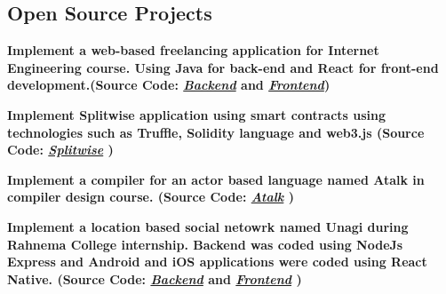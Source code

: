 \documentclass[line, mm]{sampleCV}
\begin{document}
\begin{resume}
\section{\mysidestyle Open Source Projects}
\begin{list2}

\item \textbf {Implement a web-based freelancing application for Internet Engineering course. Using Java for back-end and React for front-end development.(Source Code: \href{https://github.com/sh-soltanpour/neyanboon}{\textit{Backend}} and 
	\href{https://github.com/sh-soltanpour/daf}{\textit{Frontend}})
} 


 
\item \textbf {Implement Splitwise application using smart contracts using technologies such as Truffle, Solidity language and web3.js (Source Code: \href{https://github.com/sh-soltanpour/splitwise}{\textit{Splitwise}}
		)
}
\item \textbf {Implement a compiler for an actor based language named Atalk in compiler design course. (Source Code: \href{https://github.com/sh-soltanpour/Atalk-Compiler}{\textit{Atalk}}
	)
}

\item \textbf {Implement a location based social netowrk named Unagi during Rahnema College internship. Backend was coded using NodeJs Express and Android and iOS applications were coded using React Native. (Source Code: \href{https://github.com/sh-soltanpour/UnagiServer}{\textit{Backend}} and 
	\href{https://github.com/sh-soltanpour/UnagiApp}{\textit{Frontend}}
	)
}  


\end{list2}


\end{resume}
\end{document}
